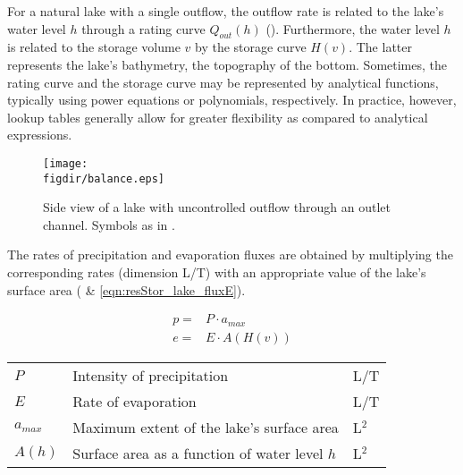 \medskip
For a natural lake with a single outflow, the outflow rate is related to the lake's water level $h$ through a rating curve $Q_{out}(h)$ (). Furthermore, the water level $h$ is related to the storage volume $v$ by the storage curve $H(v)$. The latter represents the lake's bathymetry, \ie{} the topography of the bottom. Sometimes, the rating curve and the storage curve may be represented by analytical functions, typically using power equations or polynomials, respectively. In practice, however, lookup tables generally allow for greater flexibility as compared to analytical expressions.

\begin{figure}
  \centering
  \texttt{[image: \\figdir/balance.eps]}
  \caption[Side view of a lake with uncontrolled outflow through an outlet channel.]{Side view of a lake with uncontrolled outflow through an outlet channel. Symbols as in . \label{fig:resStor_lake_massBalance}}
\end{figure}

The rates of precipitation and evaporation fluxes are obtained by multiplying the corresponding rates (dimension L/T) with an appropriate value of the lake's surface area ( \& \ref{eqn:resStor_lake_fluxE}).

\begin{align}
p= & P \cdot a_{max}  \label{eqn:resStor_lake_fluxP} \\
e= & E \cdot A(H(v))  \label{eqn:resStor_lake_fluxE}
\end{align}

\begin{tabular}{lp{}l}
  $P$ & Intensity of precipitation & L/T \\
  $E$ & Rate of evaporation & L/T \\
  $a_{max}$ & Maximum extent of the lake's surface area & L$^2$ \\
  $A(h)$ & Surface area as a function of water level $h$ & L$^2$ \\
\end{tabular}

